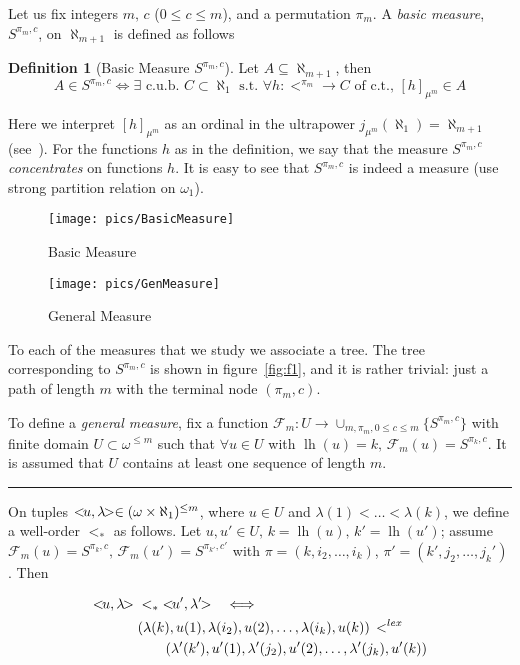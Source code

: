 \documentclass[bibother]{asl}
\theoremstyle{definition}
\newtheorem{defn}[thm]{Definition}
\theoremstyle{remark}
\newcommand{\om}{\omega}
\newcommand{\al}[1]{{\aleph_{#1}}}
\newcommand{\lh}{\operatorname{lh}}
\newcommand{\sF}{\mathcal{F}}
\newcommand{\rc}[2]{{\color{red}#2}\marginnote{{\color{red}#1}}}
\newcommand{\ns}{{\mkern-7mu}}
\begin{document}
Let us fix integers $m,\, c$ ($0\le c\le m$), and a permutation $\pi_m$. 
A {\em basic measure}, $S^{\pi_m,c}$, on $\al{m+1}$ is defined as follows
\begin{defn}[Basic Measure $S^{\pi_m,c}$]
Let $A\subseteq \aleph_{m+1}$, then
$$
A\in S^{\pi_m,c} \iff \exists \textrm{ c.u.b. } C\subset \aleph_1 \textrm{ s.t. }\forall h:<^{\pi_m}\to C \textrm{ of c.t.}, \, [h]_{\mu^m}\in A 
$$
\end{defn}

Here we interpret $[h]_{\mu^m}$ as an ordinal in the ultrapower $j_{\mu^m}(\al{1})=\al{m+1}$
(see~\cite{Ke1}).
For the functions $h$ as in the definition, we say that the measure $S^{\pi_m,c}$
{\em concentrates} on functions $h$. It is easy to see that $S^{\pi_m,c}$ is indeed a measure (use strong partition relation on $\om_1$).

\begin{figure}[h!]
  \centering
    \texttt{[image: pics/BasicMeasure]}
  \caption{Basic Measure}
  \label{fig:basicmeasure}
\end{figure}

\begin{figure}[h!]
  \centering
    \texttt{[image: pics/GenMeasure]}
  \caption{General Measure}
  \label{fig:genmeasure}
\end{figure}

To each of the measures that we study we associate a tree. The tree corresponding to  $S^{\pi_m,c}$ is 
shown in figure~\ref{fig:f1}, and it is rather trivial: just a path of length $m$ with the terminal node $(\pi_m,c)$. 

To define a {\em general measure}, 
fix a function $\sF_m: U\to \cup_{m,\pi_m,0\le c\le m} \{ S^{\pi_m,c} \}$ 
with finite domain $U\subset \omega^{\le m}$ such that $\forall u\in U$ with
$\lh(u)=k,\, \sF_m(u)=S^{\pi_k,c}$. 
It is assumed that $U$ contains at least one sequence of length $m$.

\rc{!}{\hrule}

On tuples $<\ns u,\lambda\ns >\in (\omega\times \aleph_1)^{\le m}$, where $u\in U$ and 
$\lambda(1)<\dots<\lambda(k)$, we define a well-order $<_*$ as follows.
Let $u, u'\in U, \, k=\lh(u),\, k'=\lh(u')$; assume  $\sF_m(u)=S^{\pi_k,c}, \,
\sF_m(u')=S^{\pi_{k'},c'}$ with $\pi=(k,i_2,\dots,i_k)$,   $\pi'=(k',j_2,\dots,j_{k}')$. Then

\begin{equation}
\begin{split} 
<\ns u,\lambda\ns >\; & <_* \; <\ns u',\lambda'\ns >  \quad \iff \quad \\
& (\lambda(k),u(1),\lambda(i_2),u(2),\dots,\lambda(i_k),u(k)) \, <^{lex} \, \\
& \qquad (\lambda'(k'),u'(1),\lambda'(j_2),u'(2),\dots,\lambda'(j_k),u'(k))
\end{split}
\end{equation}
\end{document}

